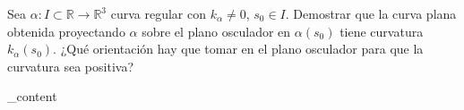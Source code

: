 \begin{ejr}[60]
  Sea $\alpha: I \subset \mathbb{R} \to \mathbb{R}^{3}$ curva regular con $k_{\alpha} \neq 0$, $s_{0} \in I$. Demostrar que la curva plana obtenida proyectando $\alpha$ sobre el plano osculador en $\alpha(s_{0})$ tiene curvatura $k_{\alpha}(s_{0})$. ¿Qué orientación hay que tomar en el plano osculador para que la curvatura sea positiva?
\end{ejr}

\begin{sol}[60]
  _content
\end{sol}
